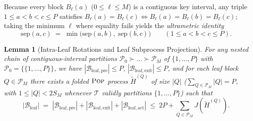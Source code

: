 \documentclass[11pt]{article}
\newtheorem{lemma}[theorem]{Lemma}
\theoremstyle{definition}
\theoremstyle{remark}
\newcommand{\sep}{\mathrm{sep}}
\newcommand{\POP}{\textnormal{\scshape Pop}}
\begin{document}
Because every block $B_\ell(a)$ ($0 \le \ell \le M$) is a contiguous key interval, any triple $1 \le a < b < c \le P$ satisfies $B_\ell(a) = B_\ell(c) \iff B_\ell(a) = B_\ell(b) = B_\ell(c)$; taking the minimum $\ell$ where equality fails yields the \emph{ultrametric identity}
\begin{equation}
\label{eq:ultrametric}
\sep(a, c) \;=\; \min\big(\sep(a, b),\; \sep(b, c)\big) \qquad (1 \le a < b < c \le P).
\end{equation}

\begin{lemma}[Intra-Leaf Rotations and Leaf Subprocess Projection]
\label{lem:bucket-leaf}
For any nested chain of contiguous-interval partitions $\mathcal{P}_0 \succ \dots \succ \mathcal{P}_M$ of $\{1, \dots, P\}$ with $\mathcal{P}_0 = \{\{1, \dots, P\}\}$, we have $|\mathcal{B}_{\mathrm{leaf,pre}}| \le P$, $|\mathcal{B}_{\mathrm{leaf,exit}}| \le P$, and for each leaf block $Q \in \mathcal{P}_M$ there exists a folded $\POP$ process $\widetilde{H}^{(Q)}$ of size $|Q|$ ($\sum_{Q \in \mathcal{P}_M} |Q| = P$, with $1 \le |Q| < 2 S_M$ whenever $\mathcal{T}$ validly partitions $\{1, \dots, P\}$) such that
\[
|\mathcal{B}_{\mathrm{leaf}}| \;=\; |\mathcal{B}_{\mathrm{leaf,pre}}| + |\mathcal{B}_{\mathrm{leaf,exit}}| + |\mathcal{B}_{\mathrm{leaf,act}}| \;\le\; 2P + \sum_{Q \in \mathcal{P}_M} J(\widetilde{H}^{(Q)}).
\]
\end{lemma}
\end{document}
